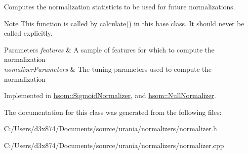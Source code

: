 \-Computes the normalization statisticts to be used for future normalizations. 

\begin{DoxyNote}{\-Note}
\-This function is called by \hyperlink{classhsom_1_1_normalizer_ad033162f2f4d207c170fd97e349dfb65}{calculate()} in this base class. \-It should never be called explicitly. 
\end{DoxyNote}

\begin{DoxyParams}{\-Parameters}
{\em features} & \-A sample of features for which to compute the normalization \\
\hline
{\em nomalizer\-Parameters} & \-The tuning parameters used to compute the normalization \\
\hline
\end{DoxyParams}


\-Implemented in \hyperlink{classhsom_1_1_sigmoid_normalizer_a96240b51c8c107cbb1183b6f61cd5a8a}{hsom\-::\-Sigmoid\-Normalizer}, and \hyperlink{classhsom_1_1_null_normalizer_afa74034fd30d11ee08535078adabb190}{hsom\-::\-Null\-Normalizer}.



\-The documentation for this class was generated from the following files\-:\begin{DoxyCompactItemize}
\item 
\-C\-:/\-Users/d3x874/\-Documents/source/urania/normalizers/normalizer.\-h\item 
\-C\-:/\-Users/d3x874/\-Documents/source/urania/normalizers/normalizer.\-cpp\end{DoxyCompactItemize}
